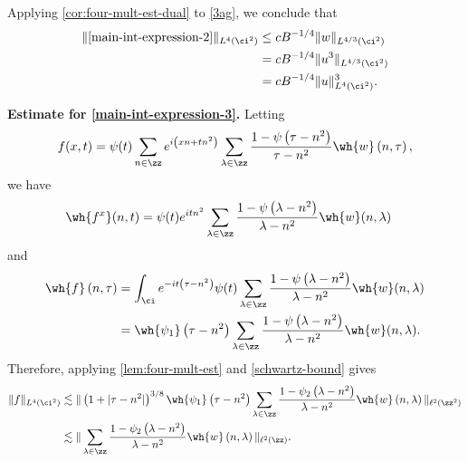 Applying \cref{cor:four-mult-est-dual} to \eqref{3ag}, we conclude that 
%
%
\begin{equation}
	\label{main-int-est-2}
	\begin{split}
		\|\eqref{main-int-expression-2}\|_{L^4(\ci^2)} 
		& \le c B^{-1/4} \|w\|_{L^{4/3}(\ci^2)}
		\\
		& = c B^{-1/4} \|u^3\|_{L^{4/3}(\ci^2)}
		\\
		& = c B^{-1/4} \|u\|^3_{L^4(\ci^2)}.
	\end{split}
\end{equation}

\vskip0.1in
\textbf{Estimate for \eqref{main-int-expression-3}.} 
Letting $$f(x,t) = \psi(t) \sum_{n \in \zz} e^{i\left( xn + tn^2 \right)} 
\sum_{\lambda \in \zz} \frac{1 - \psi\left( \tau - n^2 \right)}{\tau - n^2} 
\wh{w} \left( n, \tau \right),$$ we have
%
%
\begin{equation*}
	\begin{split}
		& \wh{f^x}(n, t) = \psi(t) e^{itn^2} \sum_{\lambda \in \zz} 
		\frac{1 - \psi\left( \lambda - n^2 \right)}{\lambda - n^2} 
		\wh{w}(n, \lambda)
	\end{split}
\end{equation*}
and
\begin{equation*}
	\begin{split}
		 \wh{f}\left( n, \tau \right)
		 & = \int_\ci e^{-it\left( \tau - n^2 
		\right)} \psi(t) \sum_{\lambda \in \zz} \frac{1 - \psi\left( 
		\lambda - n^2 
		\right)}{\lambda - n^2} \wh{w}(n, \lambda)
		\\
		& = \wh{\psi_1}\left( \tau - n^2 \right) \sum_{\lambda \in \zz}
		\frac{1 - \psi\left( 
		\lambda - n^2 
		\right)}{\lambda - n^2} \wh{w}(n, \lambda).
	\end{split}
\end{equation*}
%
%
Therefore, applying \cref{lem:four-mult-est} and 
\eqref{schwartz-bound} gives 
%
%
\begin{equation}
	\label{4hh}
	\begin{split}
		\|f\|_{L^4(\ci^2)}
		& \lesssim \|\left( 1 + | \tau - n^2| \right)^{3/8} 
		\wh{\psi_1}\left( \tau - n^2 \right) \sum_{\lambda \in \zz} 
		\frac{1 - \psi_2\left( \lambda - n^2 \right)}{\lambda - n^2} 
		\wh{w}\left( n, \lambda \right) 
		\|_{\ell^2\left( \zz^2 \right)}
		\\
		& \lesssim \|\sum_{\lambda \in \zz}
		\frac{1 - \psi_2\left( \lambda - n^2 \right)}{\lambda - n^2} \wh{w} 
		\left( n, \lambda \right) \|_{\ell^2\left( \zz \right)}.
	\end{split}
\end{equation}
